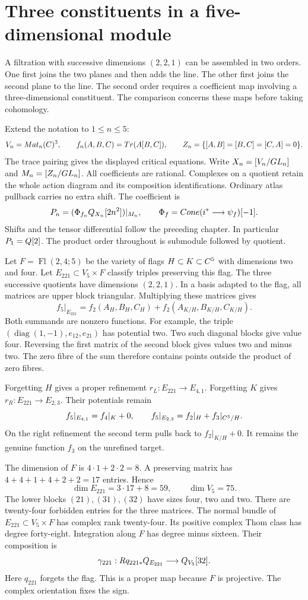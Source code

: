\section{Three constituents in a five-dimensional module}
\label{fl221:sec:geometry}

A filtration with successive dimensions $(2,2,1)$ can be assembled
in two orders. One first joins the two planes and then adds the line.
The other first joins the second plane to the line. The second order
requires a coefficient map involving a three-dimensional constituent.
The comparison concerns these maps before taking cohomology.

Extend the notation to $1\le n\le5$:
\[
 V_n=Mat_n(C)^3,\qquad f_n(A,B,C)=Tr(A[B,C]),\qquad
 Z_n=\{[A,B]=[B,C]=[C,A]=0\}.
\]
The trace pairing gives the displayed critical equations. Write
$X_n=[V_n/GL_n]$ and $M_n=[Z_n/GL_n]$.
All coefficients are rational. Complexes on a quotient retain the
whole action diagram and its composition identifications. Ordinary
atlas pullback carries no extra shift. The coefficient is
\[
 P_n=(\Phi_{f_n}Q_{X_n}[2n^2])|_{M_n},
 \qquad \Phi_f=Cone(i^*\longrightarrow\psi_f)[-1].
\]
Shifts and the tensor differential follow the preceding chapter.
In particular $P_1=Q[2]$. The product order throughout is
submodule followed by quotient.

Let $F=\operatorname{Fl}(2,4;5)$ be the variety of flags
$H\subset K\subset C^5$ with dimensions two and four. Let
$E_{221}\subset V_5\times F$ classify triples preserving this flag.
The three successive quotients have dimensions $(2,2,1)$.
In a basis adapted to the flag, all matrices are upper block triangular.
Multiplying these matrices gives
\[
 f_5|_{E_{221}}=f_2(A_H,B_H,C_H)
                  +f_2(A_{K/H},B_{K/H},C_{K/H}).
\]
Both summands are nonzero functions. For example, the triple
$(\operatorname{diag}(1,-1),e_{12},e_{21})$ has potential two.
Two such diagonal blocks give value four. Reversing the first
matrix of the second block gives values two and minus two.
The zero fibre of the sum therefore contains points outside the
product of zero fibres.

Forgetting $H$ gives a proper refinement
$r_L:E_{221}\to E_{4,1}$. Forgetting $K$ gives
$r_R:E_{221}\to E_{2,3}$. Their potentials remain
\[
 f_5|_{E_{4,1}}=f_4|_K+0,\qquad
 f_5|_{E_{2,3}}=f_2|_H+f_3|_{C^5/H}.
\]
On the right refinement the second term pulls back to
$f_2|_{K/H}+0$. It remains the genuine function $f_3$ on the
unrefined target.

The dimension of $F$ is $4\cdot1+2\cdot2=8$.
A preserving matrix has $4+4+1+4+2+2=17$ entries. Hence
\[
 \dim E_{221}=3\cdot17+8=59,\qquad \dim V_5=75.
\]
The lower blocks $(21),(31),(32)$ have sizes four, two and two.
There are twenty-four forbidden entries for the three matrices.
The normal bundle of $E_{221}\subset V_5\times F$ has complex
rank twenty-four. Its positive complex Thom class has degree
forty-eight. Integration along $F$ has degree minus sixteen.
Their composition is
\[
 \gamma_{221}:Rq_{221*}Q_{E_{221}}\longrightarrow Q_{V_5}[32].
\]
Here $q_{221}$ forgets the flag. This is a proper map because $F$
is projective. The complex orientation fixes the sign.

